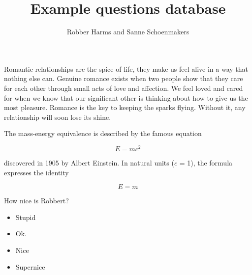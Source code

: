 \documentclass{article}
\newenvironment{question}[2]{}{}
\newenvironment{answers}{\begin{itemize}}{\end{itemize}}
\newcommand\answerinfo[1]{}
\newcommand\metadata[1]{}
\newcommand\analytics[1]{}
\begin{document}
	
\title{Example questions database}
\author{Robber Harms and Sanne Schoenmakers}
\maketitle


\begin{question}{multiple_choice}{#2020_01}
Romantic relationships are the spice of life, they make us feel alive in a way that nothing else can. Genuine romance exists when two people show that they care for each other through small acts of love and affection. We feel loved and cared for when we know that our significant other is thinking about how to give us the most pleasure. Romance is the key to keeping the sparks flying. Without it, any relationship will soon lose its shine.


The mass-energy equivalence is described by the famous equation

\[E=mc^2\]

discovered in 1905 by Albert Einstein. 
In natural units ($c$ = 1), the formula expresses the identity

\begin{equation}
E=m
\end{equation}

How nice is Robbert?

\begin{answers}
	\item Stupid  
		\answerinfo{points:-1}
	\item Ok.
		\answerinfo{points:0.2}
	\item Nice
	\item Supernice
		\answerinfo{correct,points:1}
\end{answers}

\metadata{
	thinking_type: knowledge
	related_concepts: [Brains, Body, Behaviour]
	chapter: 1
	difficulty: 10
}

\analytics{
- 2020_qz1: 
	participants: 1
	nmr_correct: 0
- 2020_qz1:
	participants: 200
	nmr_correct: 25
}
\end{question}


	
\end{document}

